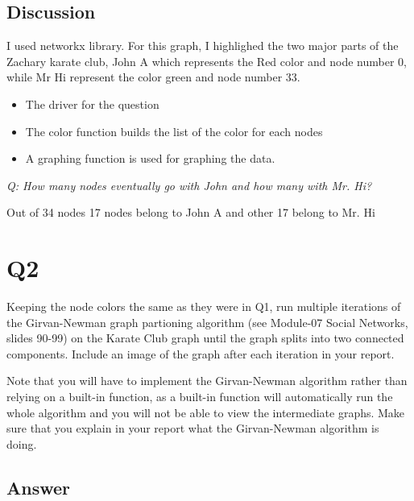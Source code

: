 \documentclass[12pt]{article}
\begin{document}
\subsection*{Discussion}
I used networkx library. For this graph, I highlighed the two major parts of the Zachary karate club, John A which represents the Red color and node number 0, while Mr Hi represent the color green and node number 33. 
\begin{itemize}
        \item The driver for the question 
        \item The color function builds the list of the color for each nodes 
        
        \item A graphing function is used for graphing the data. 
         
\end{itemize}
\emph{Q: How many nodes eventually go with John and how many with Mr. Hi?}

 Out of 34 nodes 17 nodes belong to John A and other 17 belong to Mr. Hi
\section*{Q2}
Keeping the node colors the same as they were in Q1, run multiple iterations of the Girvan-Newman graph partioning algorithm (see Module-07 Social Networks, slides 90-99) on the Karate Club graph until the graph splits into two connected components. Include an image of the graph after each iteration in your report.

Note that you will have to implement the Girvan-Newman algorithm rather than relying on a built-in function, as a built-in function will automatically run the whole algorithm and you will not be able to view the intermediate graphs. Make sure that you explain in your report what the Girvan-Newman algorithm is doing.
\subsection*{Answer}

\end{document}
